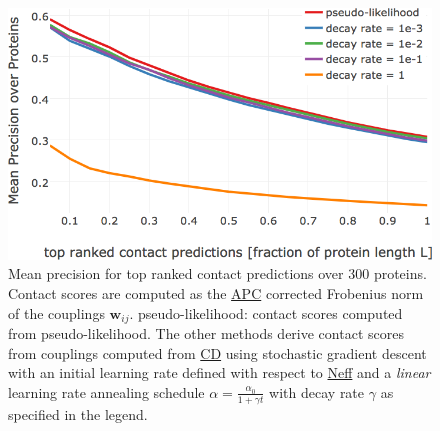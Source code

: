 \documentclass[11pt,a4paper,twoside]{book}
\newcommand{\wij}{\mathbf{w}_{ij}}
\theoremstyle{definition}
\theoremstyle{definition}
\theoremstyle{remark}
\begin{document}
\begin{figure}

{\centering \includegraphics[width=0.85\linewidth]{img/full_likelihood/appendix/precision_vs_rank_alpha0_0_lin_decayrate} 

}

\caption{Mean precision for top ranked
contact predictions over 300 proteins. Contact scores are computed as
the \protect\hyperlink{abbrev}{APC} corrected Frobenius norm of the
couplings \(\wij\). pseudo-likelihood: contact scores computed from
pseudo-likelihood. The other methods derive contact scores from
couplings computed from \protect\hyperlink{abbrev}{CD} using stochastic
gradient descent with an initial learning rate defined with respect to
\protect\hyperlink{abbrev}{Neff} and a \emph{linear} learning rate
annealing schedule \(\alpha = \frac{\alpha_0}{1 + \gamma t}\) with decay
rate \(\gamma\) as specified in the legend.}\label{fig:performance-cd-linschedule}
\end{figure}
\end{document}
